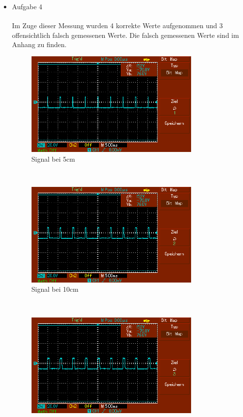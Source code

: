 \documentclass[captions=tableheading]{scrartcl}
\begin{document}
\begin{itemize}
        \item{Aufgabe 4 \\}
        \\
        Im Zuge dieser Messung wurden 4 korrekte Werte aufgenommen und 3 offensichtlich falsch gemessenen Werte.
        Die falsch gemessenen Werte sind im Anhang zu finden.
            \begin{figure}
                \centering
                \includegraphics{Lock_In Bilder/Aufgabe 4/MAP001.pdf}
                \caption{Signal bei 5cm}
                \label{fig:5cmled}
            \end{figure}  
            \\
            \begin{figure}   
                \centering 
                \includegraphics{Lock_In Bilder/Aufgabe 4/MAP002.pdf}
                \caption{Signal bei 10cm}
                \label{fig:10cmled}
            \end{figure}   
            \\
            \begin{figure}    
                \centering
                \includegraphics{Lock_In Bilder/Aufgabe 4/MAP003.pdf}

\end{figure}
\end{itemize}
\end{document}

